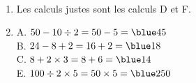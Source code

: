    \ \\ [-5mm]
   \begin{enumerate}
      \item Les calculs justes sont les calculs {\blue D} et {\blue F}. \smallskip
      \item A. $50-10\div2 =50-5 ={\blue 45}$ \\ [1mm]
         B. $24-8+2 =16+2 ={\blue 18}$ \\ [1mm]
         C. $8+2\times3 =8+6 ={\blue 14}$ \\ [1mm]
         E. $100\div2\times5 =50\times5 = {\blue 250}$
   \end{enumerate}
